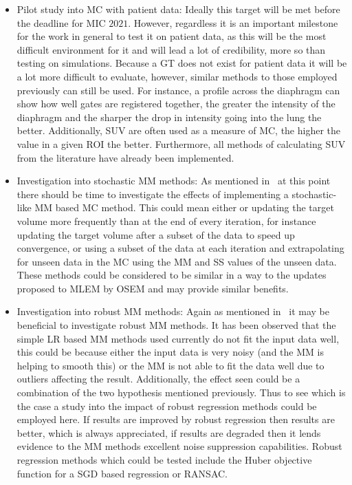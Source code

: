 \begin{itemize}
                \item Pilot study into \gls{MC} with patient data: Ideally this target will be met before the deadline for \gls{MIC} $2021$. However, regardless it is an important milestone for the work in general to test it on patient data, as this will be the most difficult environment for it and will lead a lot of credibility, more so than testing on simulations. Because a \gls{GT} does not exist for patient data it will be a lot more difficult to evaluate, however, similar methods to those employed previously can still be used. For instance, a profile across the diaphragm can show how well gates are registered together, the greater the intensity of the diaphragm and the sharper the drop in intensity going into the lung the better. Additionally, \gls{SUV} are often used as a measure of \gls{MC}, the higher the value in a given \gls{ROI} the better. Furthermore, all methods of calculating \gls{SUV} from the literature have already been implemented.
    
                \item Investigation into stochastic \gls{MM} methods: As mentioned in~ at this point there should be time to investigate the effects of implementing a stochastic-like \gls{MM} based \gls{MC} method. This could mean either or updating the target volume more frequently than at the end of every iteration, for instance updating the target volume after a subset of the data to speed up convergence, or using a subset of the data at each iteration and extrapolating  for unseen data in the \gls{MC} using the \gls{MM} and \gls{SS} values of the unseen data. These methods could be considered to be similar in a way to the updates proposed to \gls{MLEM} by \gls{OSEM} and may provide similar benefits.
    
                \item Investigation into robust \gls{MM} methods: Again as mentioned in~ it may be beneficial to investigate robust \gls{MM} methods. It has been observed that the simple \gls{LR} based \gls{MM} methods used currently do not fit the input data well, this could be because either the input data is very noisy (and the \gls{MM} is helping to smooth this) or the \gls{MM} is not able to fit the data well due to outliers affecting the result. Additionally, the effect seen could be a combination of the two hypothesis mentioned previously. Thus to see which is the case a study into the impact of robust regression methods could be employed here. If results are improved by robust regression then results are better, which is always appreciated, if results are degraded then it lends evidence to the \gls{MM} methods excellent noise suppression capabilities. Robust regression methods which could be tested include the Huber objective function for a \gls{SGD} based regression or \gls{RANSAC}.
    

\end{itemize}
